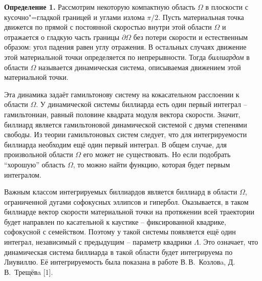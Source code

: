 \vzmscaption


\textbf{Определение 1.} {Рассмотрим некоторую компактную область $ \Omega $ в плоскости с кусочно"=гладкой границей и углами излома $ \pi/2 $. Пусть материальная точка движется по прямой с постоянной скоростью внутри этой области $ \Omega $ и отражается о гладкую часть границы $ \partial \Omega $ без потери скорости и естественным образом: угол падения равен углу отражения. В остальных случаях движение этой материальной точки определяется по непрерывности. Тогда \textit{биллиардом} в области $ \Omega $ называется динамическая система, описываемая движением этой материальной точки.}

Эта динамика задаёт гамильтонову систему на кокасательном расслоении к области $\Omega$. У динамической системы биллиарда есть один первый интеграл -- гамильтониан, равный половине квадрата модуля вектора скорости. Значит, биллиард является гамильтоновой динамической системой с двумя степенями свободы. Из теории гамильтоновых систем следует, что для интегрируемости биллиарда необходим ещё один первый интеграл. В общем случае, для произвольной области $ \Omega $ его может не существовать. Но если подобрать ``хорошую'' область $ \Omega $, то можно найти функцию, которая будет первым интегралом.

Важным классом интегрируемых биллиардов является биллиард в области $\Omega$, ограниченной дугами софокусных эллипсов и гипербол. Оказывается, в таком биллиарде вектор скорости материальной точки на протяжении всей траектории будет направлен по касательной к каустике -- фиксированной квадрике, софокусной с семейством. Поэтому у такой системы появляется ещё один интеграл, независимый с предыдущим -- параметр квадрики $ \Lambda $. Это означает, что динамическая система биллиарда в такой области будет интегрируема по Лиувиллю. Её интегрируемость была показана в работе В.\,В.~Козловa, Д.\,В.~Трещёвa [1].

